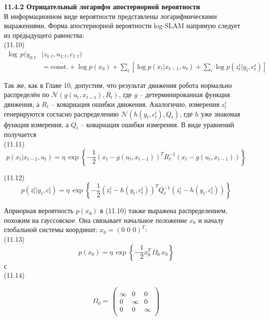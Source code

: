 \documentclass[10pt,a4paper]{article}
\begin{document}
\textbf{11.4.2	Отрицательный логарифм апостериорной вероятности}\\

В информационном виде вероятности представлены логарифмическими выражениями. Форма апостериорной вероятности log-SLAM напрямую следует из предыдущего равенства:\\

(11.10)
\begin{equation*}
\begin{split}
\log\,p(y_{0:t}&|z_{1:t},u_{1:t},c_{1:t})\\
&=\text{const.}+\log p(x_0)+\sum_t\left[ \log p(x_t|x_{t-1},u_t)+\sum_i\log p(z_t^i|y_t,c_t^i)\right] 
\end{split}
\end{equation*}

Так же, как в Главе 10, допустим, что результат движения робота нормально распределён по $\mathcal{N}(g(u_t, x_{t-1}), R_t)$, где $g$ – детерминированная функция движения, а $R_t$ – ковариация ошибки движения. Аналогично, измерения $z_t^i$ генерируются согласно распределению $\mathcal{N}(h(y_t,c_t^i),Q_t)$, где $h$ уже знакомая функция измерения, а $Q_t$ – ковариация ошибки измерения. В виде уравнений получается\\

(11.11)
$$p(x_t|x_{t-1},u_t)=\eta\,\exp\left\lbrace -\frac{1}{2}(x_t-g(u_t,x_{t-1}))^TR_t^{-1}(x_t-g(u_t,x_{t-1}))\right\rbrace $$

(11.12)
$$p(z_t^i|y_t,c_t^i)=\eta\,\exp\left\lbrace -\frac{1}{2}(z_t^i-h(y_t,c_t^i))^TQ_t^{-1}(z_t^i-h(y_t,c_t^i))\right\rbrace $$

Априорная вероятность $p(x_0)$ в (11.10) также выражена распределением, похожим на гауссовское. Она связывает начальное положение $x_0$ и началу глобальной системы координат:  $x_0=(0\,\,0\,\,0)^T$:\\

(11.13)
$$p(x_0)=\eta\,\exp\left\lbrace -\frac{1}{2}x_0^T\,\varOmega_0\,x_0\right\rbrace $$
с\\

(11.14)
\begin{minipage}{0.2\textwidth}
\begin{equation*}
\varOmega_0=\,\left(\begin{array}{ccc}\\
\infty&0&0\\
0&\infty&0\\
0&0&\infty\\
\end{array} \right)
\end{equation*}
\end{minipage}
\end{document}
